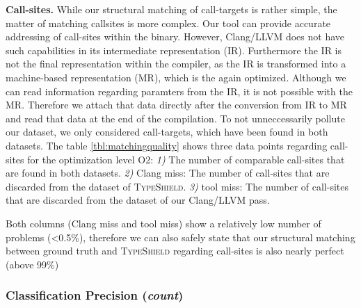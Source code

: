 \textbf{Call-sites.} While our structural matching of call-targets is rather simple, the matter of matching callsites is more complex. Our tool can provide accurate addressing of call-sites within the binary. However, Clang/LLVM does not have such capabilities in its intermediate representation (IR). Furthermore the IR is not the final representation within the compiler, as the IR is transformed into a machine-based representation (MR), which is the again optimized. Although we can read information regarding paramters from the IR, it is not possible with the MR. Therefore we attach that data directly after the conversion from IR to MR and read that data at the end of the compilation. To not unneccessarily pollute our dataset, we only considered call-targets, which have been found in both datasets. 
The table \ref{tbl:matchingquality} shows three data points regarding call-sites for the optimization level O2:
\textit{1)} The number of comparable call-sites that are found in both datasets.
\textit{2)} Clang miss: The number of call-sites that are discarded from the dataset of \textsc{TypeShield}.
\textit{3)} tool miss: The number of call-sites that are discarded from the dataset of our Clang/LLVM pass.

Both columns (Clang miss and tool miss) show a relatively low number of problems (<0.5\%), therefore we can also safely state that our structural matching between ground truth and \textsc{TypeShield} regarding call-sites is also nearly perfect (above 99\%)

\subsubsection{Classification Precision (\textit{count})}
\label{subsection:typeshieldcountprecision}

